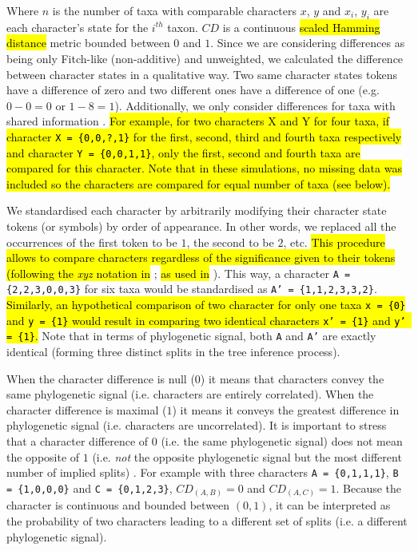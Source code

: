 \documentclass[12pt,letterpaper]{article}
\begin{document}

\noindent Where $n$ is the number of taxa with comparable characters $x$, $y$ and $x_i$, $y_i$ are each character's state for the $i^{th}$ taxon.
$CD$ is a continuous \hl{scaled Hamming distance} metric bounded between $0$ and $1$.%
Since we are considering differences as being only Fitch-like (non-additive) and unweighted, we calculated the difference between character states in a qualitative way.
Two same character states tokens have a difference of zero and two different ones have a difference of one (e.g. $0 - 0 = 0$ or $1 - 8 = 1$).
Additionally, we only consider differences for taxa with shared information \citep[i.e. a Gower distance;][]{GowerDist}.
\hl{For example, for two characters X and Y for four taxa, if character \texttt{X = \{0,0,?,1\}} for the first, second, third and fourth taxa respectively and character \texttt{Y = \{0,0,1,1\}}, only the first, second and fourth taxa are compared for this character.
Note that in these simulations, no missing data was included so the characters are compared for equal number of taxa (see below).}

We standardised each character by arbitrarily modifying their character state tokens (or symbols) by order of appearance.
In other words, we replaced all the occurrences of the first token to be $1$, the second to be $2$, etc.
\hl{This procedure allows to compare characters regardless of the significance given to their tokens (following the \textit{xyz} notation in }
\citealt{felsenstein2004inferring}; \hl{as used in} \citealt{Davalos01072014}).
This way, a character \texttt{A = \{2,2,3,0,0,3\}} for six taxa would be standardised as \texttt{A' = \{1,1,2,3,3,2\}}.
\hl{Similarly, an hypothetical comparison of two character for only one taxa \texttt{x = \{0\}} and \texttt{y = \{1\}} would result in comparing two identical characters \texttt{x' = \{1\}} and \texttt{y' = \{1\}}.}
Note that in terms of phylogenetic signal, both \texttt{A} and \texttt{A'} are exactly identical (forming three distinct splits in the tree inference process).

When the character difference is null ($0$) it means that characters convey the same phylogenetic signal (i.e. characters are entirely correlated).
When the character difference is maximal ($1$) it means it conveys the greatest difference in phylogenetic signal (i.e. characters are uncorrelated).
It is important to stress that a character difference of $0$ (i.e. the same phylogenetic signal) does not mean the opposite of $1$ (i.e. \textit{not} the opposite phylogenetic signal but the most different number of implied splits) .
For example with three characters \texttt{A = \{0,1,1,1\}}, \texttt{B = \{1,0,0,0\}} and \texttt{C = \{0,1,2,3\}}, $CD_{(A,B)} = 0$ and $CD_{(A,C)} = 1$.
Because the character is continuous and bounded between $(0,1)$, it can be interpreted as the probability of two characters leading to a different set of splits (i.e. a different phylogenetic signal).
\end{document}
